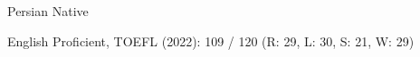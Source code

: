 

\begin{cvskills}

  \cvskill
    {Persian} %
    {Native} %

  \cvskill
    {English} %
    {Proficient, TOEFL (2022): 109 / 120 (R: 29, L: 30, S: 21, W: 29)} %

\end{cvskills}
